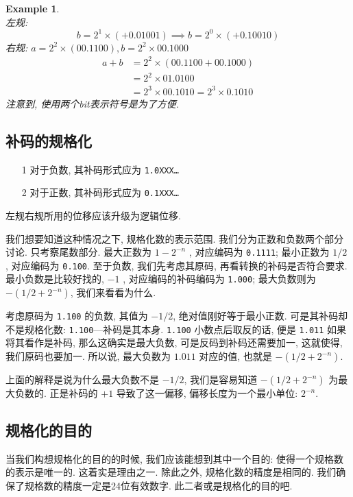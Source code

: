 \documentclass[12pt]{ctexart}
\theoremstyle{definition}
\theoremstyle{plain}
\newtheorem{exam}[definition]{Example}
\begin{document}
\begin{exam}\quad\\ 
左规:
\[
b = 2 ^{1} \times (+ 0.01001) \implies b = 2 ^{0} \times (+ 0.1 0010)
\]
右规: \(a = 2^{2} \times (00.1100) , b = 2^{2	} \times 00.1000\)
\[
\begin{aligned}
a + b & = 2 ^{2} \times ( 00. 1100 + 00.1000) \\ 
& =  2^{2} \times 01.0100 \\ 
&  = 2 ^{3} \times 00.1010 = 2 ^{3} \times 0.1010
\end{aligned}
\]
注意到, 使用两个bit表示符号是为了方便. 
\end{exam}

\subsection{补码的规格化}
\begin{itemize}
\item [1] 对于负数, 其补码形式应为 \texttt{1.0XXX\dots} 
\item [2] 对于正数, 其补码形式应为 \texttt{0.1XXX\dots}
\end{itemize}
左规右规所用的位移应该升级为逻辑位移. 

我们想要知道这种情况之下, 规格化数的表示范围. 我们分为正数和负数两个部分讨论. 只考察尾数部分. 
最大正数为 \(1 - 2 ^{-n}\) , 对应编码为 \texttt{0.1111}; 最小正数为 \(1/2\) , 对应编码为 \texttt{0.100}. 至于负数, 我们先考虑其原码, 再看转换的补码是否符合要求. 最小负数是比较好找的, \(-1\) , 对应编码的补码编码为 \texttt{1.000}; 最大负数则为 \(- (1/2 + 2 ^{-n})\), 我们来看看为什么. 

考虑原码为 \texttt{1.100} 的负数, 其值为 \(-1/2\), 绝对值刚好等于最小正数. 可是其补码却不是规格化数: \texttt{1.100}---补码是其本身. \texttt{1.100} 小数点后取反的话, 便是 \texttt{1.011} 如果将其看作是补码, 那么这确实是最大负数, 可是反码到补码还需要加一, 这就使得, 我们原码也要加一. 所以说, 最大负数为 \(1.011\) 对应的值, 也就是 \(-(1/2 + 2^{-n})\). 

上面的解释是说为什么最大负数不是 \(-1/2\), 我们是容易知道 \(-(1/2 + 2 ^{-n})\) 为最大负数的. 正是补码的 \(+1\) 导致了这一偏移, 偏移长度为一个最小单位: \(2 ^{-n}\). 
\subsection{规格化的目的}
当我们构想规格化的目的的时候, 我们应该能想到其中一个目的: 使得一个规格数的表示是唯一的. 这着实是理由之一. 除此之外, 规格化数的精度是相同的. 我们确保了规格数的精度一定是24位有效数字. 此二者或是规格化的目的吧. 
\end{document}
